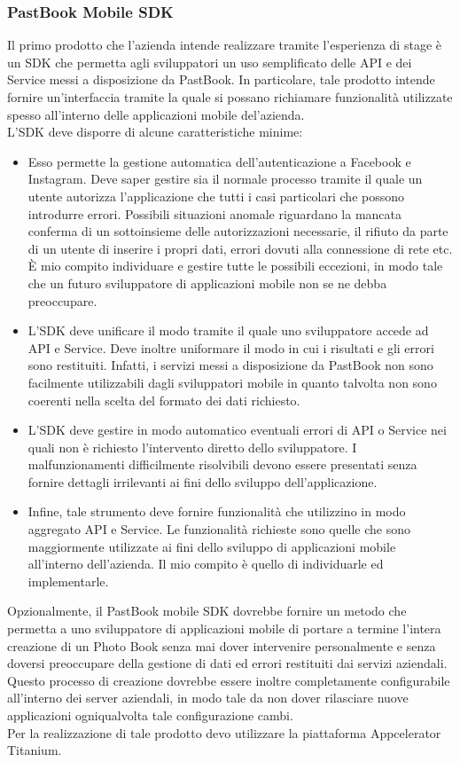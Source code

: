 			\subsubsection{PastBook Mobile SDK}
				Il primo prodotto che l'azienda intende realizzare tramite l'esperienza di stage è un SDK che permetta agli
				sviluppatori un uso semplificato delle API e dei Service messi a disposizione da PastBook. In particolare, tale
				prodotto intende fornire un'interfaccia tramite la quale si possano richiamare funzionalità utilizzate spesso
				all'interno delle applicazioni mobile del'azienda.\\
				L'SDK deve disporre di alcune caratteristiche minime:
				\begin{itemize}
					\item Esso permette la gestione automatica dell'autenticazione a Facebook e Instagram. Deve saper gestire sia
					il normale processo tramite il quale un utente autorizza l'applicazione che tutti i casi particolari che
					possono introdurre errori. Possibili situazioni anomale riguardano la mancata conferma di un sottoinsieme
					delle autorizzazioni necessarie, il rifiuto da parte di un utente di inserire i propri dati, errori dovuti
					alla connessione di rete etc. È mio compito individuare e gestire tutte le possibili eccezioni, in modo tale
					che un futuro sviluppatore di applicazioni mobile non se ne debba preoccupare.
					\item L'SDK deve unificare il modo tramite il quale uno sviluppatore accede ad API e Service. Deve inoltre
					uniformare il modo in cui i risultati e gli errori sono restituiti. Infatti, i servizi messi a disposizione
					da PastBook non sono facilmente utilizzabili dagli sviluppatori mobile in quanto talvolta non sono coerenti
					nella scelta del formato dei dati richiesto.
					\item L'SDK deve gestire in modo automatico eventuali errori di API o Service nei quali non è richiesto
					l'intervento diretto dello sviluppatore. I malfunzionamenti difficilmente risolvibili devono essere
					presentati senza fornire dettagli irrilevanti ai fini dello sviluppo dell'applicazione.
					\item Infine, tale strumento deve fornire funzionalità che utilizzino in modo aggregato API e Service. Le
					funzionalità richieste sono quelle che sono maggiormente utilizzate ai fini dello sviluppo di applicazioni
					mobile all'interno dell'azienda. Il mio compito è quello di individuarle ed implementarle.
				\end{itemize}
				Opzionalmente, il PastBook mobile SDK dovrebbe fornire un metodo che permetta a uno sviluppatore di applicazioni
				mobile di portare a termine l'intera creazione di un Photo Book senza mai dover intervenire personalmente e senza
				doversi preoccupare della gestione di dati ed errori restituiti dai servizi aziendali. Questo processo di creazione
				dovrebbe essere inoltre completamente configurabile all'interno dei server aziendali, in modo tale da non dover
				rilasciare nuove applicazioni ogniqualvolta tale configurazione cambi.\\
				Per la realizzazione di tale prodotto devo utilizzare la piattaforma Appcelerator Titanium.
